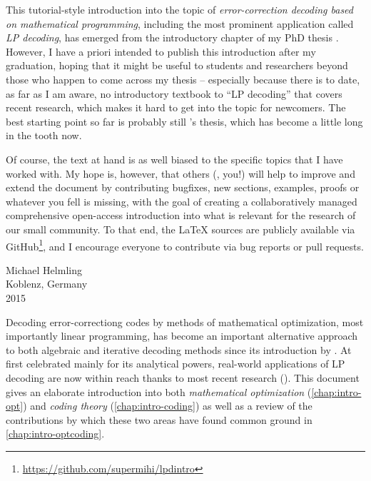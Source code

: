 \documentclass[
  paper=a4,
  parskip=half,
  english,
  fontsize=11pt,
  DIV=9,
  twoside=true,
  toc=bib,
  numbers=noendperiod
]{scrbook}
\title{\mytitle}
\subtitle{A tutorial}
\author{\myauthor}
\theoremstyle{change}
\theoremstyle{nonumberplain}
\begin{document}
\maketitle
\tableofcontents

This tutorial-style introduction into the topic of \emph{error-correction decoding based on mathematical programming}, including the most prominent application called \emph{LP decoding}, has emerged from the introductory chapter of my PhD thesis \cite{Helmling15PhD}. However, I have a priori intended to publish this introduction after my graduation, hoping that it might be useful to students and researchers beyond those who happen to come across my thesis – especially because there is to date, as far as I am aware, no introductory textbook to \enquote{LP decoding} that covers recent research, which makes it hard to get into the topic for newcomers. The best starting point so far is probably still \citeauthor{Feldman03PhD}'s thesis, which has become a little long in the tooth now.

Of course, the text at hand is as well biased to the specific topics that I have worked with. My hope is, however, that others (\ie, you!) will help to improve and extend the document by contributing bugfixes, new sections, examples, proofs or whatever you fell is missing, with the goal of creating a collaboratively managed comprehensive open-access introduction into what is relevant for the research of our small community. To that end, the \LaTeX{} sources are publicly available via GitHub\footnote{\url{https://github.com/supermihi/lpdintro}}, and I encourage everyone to contribute via bug reports or pull requests.
\begin{FlushRight}
  Michael Helmling\\
  Koblenz, Germany\\
  2015
\end{FlushRight}

Decoding error-correctiong codes by methods of mathematical optimization, most importantly linear programming, has become an important alternative approach to both algebraic and iterative decoding methods since its introduction by \textcite{Feldman+05LPDecoding}. At first celebrated mainly for its analytical powers, real-world applications of LP decoding are now within reach thanks to most recent research (\cite{Liu+12PenalizedLPD, Gensheimer+14SimplexHard}). This document gives an elaborate introduction into both \emph{mathematical optimization} (\cref{chap:intro-opt}) and \emph{coding theory} (\cref{chap:intro-coding}) as well as a review of the contributions by which these two areas have found common ground in \cref{chap:intro-optcoding}.
\end{document}
